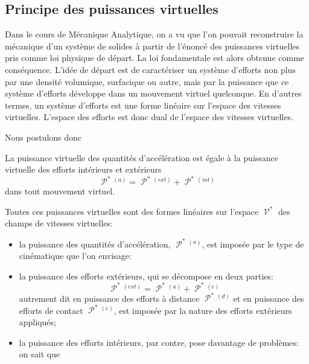 \subsection{Principe des puissances virtuelles} \label{ssec:Ch01-2.2}
Dans le cours de Mécanique Analytique, on a vu que l'on pouvait reconstruire la mécanique d'un système de solides à partir de l'énoncé des puissances virtuelles pris comme loi physique de départ.
La loi fondamentale est alors obtenue comme conséquence.
L'idée de départ est de caractériser un système d'efforts non plus par une densité volumique, surfacique ou autre, mais par la puissance que ce système d'efforts développe dans un mouvement virtuel quelconque.
En d'autres termes, un système d'efforts est une forme linéaire sur l'espace des vitesses virtuelles.
L'espace des efforts est donc dual de l'espace des vitesses virtuelles.

Nous postulons donc

\begin{Principe}
    La puissance virtuelle des quantités d'accélération est égale à la puissance virtuelle des efforts intérieurs et extérieurs
    \begin{equation}
        \mathop{\mathcal{P}}^{\ast}{\!}^{(a)} = \mathop{\mathcal{P}}^{\ast}{\!}^{(ext)} + \mathop{\mathcal{P}}^{\ast}{\!}^{(int)}
        \label{eq:Ch01-030}
    \end{equation}
    dans tout mouvement virtuel.
\end{Principe}

Toutes ces puissances virtuelles sont des formes linéaires sur l'espace $\mathop{\mathcal{V}}^{\ast}$ des champs de vitesses virtuelles:
\begin{itemize}
    \item la puissance des quantités d'accélération, $\mathop{\mathcal{P}}^{\ast}{\!}^{(a)}$, est imposée par le type de cinématique que l'on envisage:
    \item la puissance des efforts extérieurs, qui se décompose en deux parties:
        \begin{equation}
            \mathop{\mathcal{P}}^{\ast}{\!}^{(ext)} = \mathop{\mathcal{P}}^{\ast}{\!}^{(a)} + \mathop{\mathcal{P}}^{\ast}{\!}^{(c)}
            \label{eq:Ch01-031}
        \end{equation}
        autrement dit en puissance des efforts à distance $\mathop{\mathcal{P}}^{\ast}{\!}^{(d)}$ et en puissance des efforts de contact $\mathop{\mathcal{P}}^{\ast}{\!}^{(c)}$, est imposée par la nature des efforts extérieurs appliqués;
    \item la puissance des efforts intérieurs, par contre, pose davantage de problèmes:\\
        on sait que
\end{itemize}

